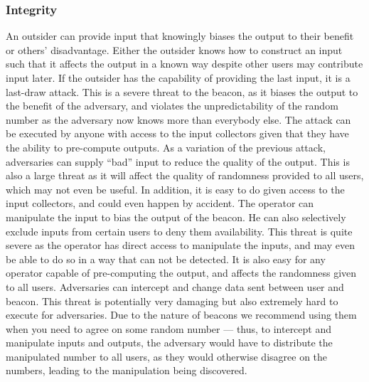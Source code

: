\subsubsection{Integrity}

 An outsider can provide input that knowingly biases the output to their benefit or others' disadvantage. Either the outsider knows how to construct an input such that it affects the output in a known way despite other users may contribute input later. If the outsider has the capability of providing the last input, it is a last-draw attack. This is a severe threat to the beacon, as it biases the output to the benefit of the adversary, and violates the unpredictability of the random number as the adversary now knows more than everybody else. The attack can be executed by anyone with access to the input collectors given that they have the ability to pre-compute outputs.
 As a variation of the previous attack, adversaries can supply \enquote{bad} input to reduce the quality of the output. This is also a large threat as it will affect the quality of randomness provided to all users, which may not even be useful. In addition, it is easy to do given access to the input collectors, and could even happen by accident.
 The operator can manipulate the input to bias the output of the beacon. He can also selectively exclude inputs from certain users to deny them availability. This threat is quite severe as the operator has direct access to manipulate the inputs, and may even be able to do so in a way that can not be detected. It is also easy for any operator capable of pre-computing the output, and affects the randomness given to all users.
 Adversaries can intercept and change data sent between user and beacon. This threat is potentially very damaging but also extremely hard to execute for adversaries. Due to the nature of beacons we recommend using them when you need to agree on some random number --- thus, to intercept and manipulate inputs and outputs, the adversary would have to distribute the manipulated number to all users, as they would otherwise disagree on the numbers, leading to the manipulation being discovered.
